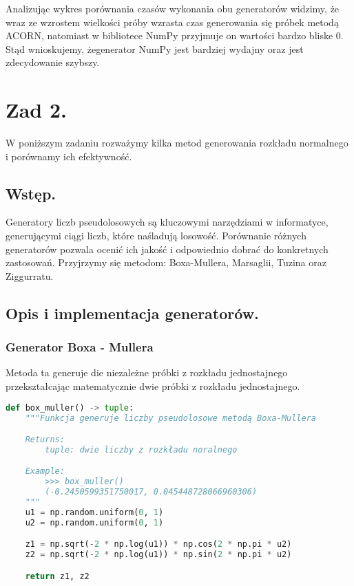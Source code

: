 \documentclass[12pt,letterpaper]{article}
\theoremstyle{definition}
\begin{document}
Analizując wykres porównania czasów wykonania obu generatorów widzimy, że wraz ze wzrostem wielkości próby wzrasta czas generowania się próbek metodą ACORN, natomiast w bibliotece NumPy przyjmuje on wartości bardzo bliske 0. Stąd wnioskujemy, żegenerator NumPy jest bardziej wydajny oraz jest zdecydowanie szybszy.

\section{Zad 2.}
W poniższym zadaniu rozważymy kilka metod generowania rozkładu normalnego i porównamy ich efektywność.

\subsection{Wstęp.}
Generatory liczb pseudolosowych są kluczowymi narzędziami w informatyce, generującymi ciągi liczb, które naśladują losowość. Porównanie różnych generatorów pozwala ocenić ich jakość i odpowiednio dobrać do konkretnych zastosowań. Przyjrzymy się metodom: Boxa-Mullera, Marsaglii, Tuzina oraz Ziggurratu.

\subsection{Opis i implementacja generatorów.}

\subsubsection{Generator Boxa - Mullera}
Metoda ta generuje die niezależne próbki z rozkładu jednostajnego przekształcając matematycznie dwie próbki z rozkładu jednostajnego.
\begin{lstlisting}[language=Python, caption=Implementacja metody Boxa - Mullera]
def box_muller() -> tuple:
    """Funkcja generuje liczby pseudolosowe metodą Boxa-Mullera

    Returns:
        tuple: dwie liczby z rozkładu noralnego

    Example:
        >>> box_muller()
        (-0.2450599351750017, 0.045448728066960306)
    """
    u1 = np.random.uniform(0, 1)
    u2 = np.random.uniform(0, 1)

    z1 = np.sqrt(-2 * np.log(u1)) * np.cos(2 * np.pi * u2)
    z2 = np.sqrt(-2 * np.log(u1)) * np.sin(2 * np.pi * u2)

    return z1, z2
\end{lstlisting}
\end{document}
